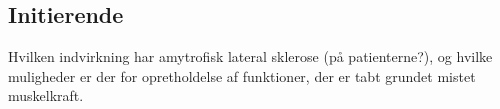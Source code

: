 \subsection{Initierende}
Hvilken indvirkning har amytrofisk lateral sklerose (på patienterne?), og hvilke muligheder er der for opretholdelse af funktioner, der er tabt grundet mistet muskelkraft. 